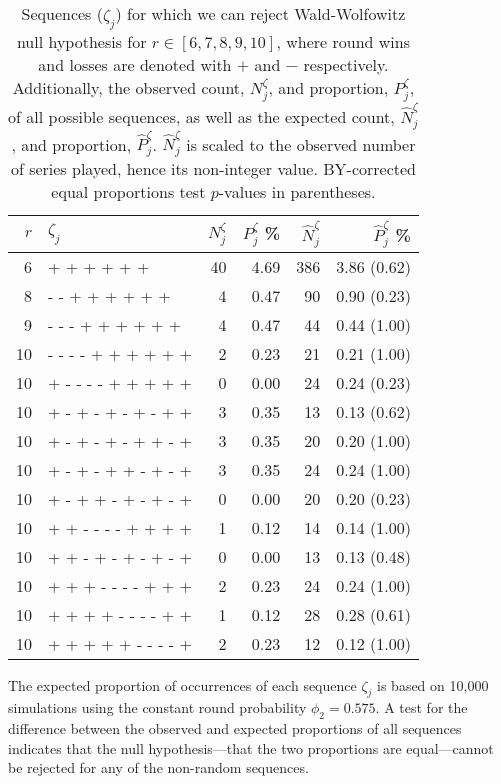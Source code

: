 \documentclass{article}
\begin{document}
\begin{table}

\caption{Sequences ($\zeta_j$) for which we can reject Wald-Wolfowitz null hypothesis for $r \in [6, 7, 8, 9, 10]$, where round wins and losses are denoted with $+$ and $-$ respectively. Additionally, the observed count, $N^{\zeta}_j$, and proportion, $P^{\zeta}_j$, of all possible sequences, as well as the expected count, $\hat{N}^{\zeta}_j$, and proportion, $\hat{P}^{\zeta}_j$. $\hat{N}^{\zeta}_j$ is scaled to the observed number of series played, hence its non-integer value. BY-corrected equal proportions test $p$-values in parentheses.}

\centering
\begin{tabular}{rlrrrr}
\toprule
$r$ & $\zeta_j$ & $N^{\zeta}_j$ & $P^{\zeta}_j$ \% & $\hat{N}^{\zeta}_j$ & $\hat{P}^{\zeta}_j$ \% \\ 
\midrule

6 & + + + + + + & 40 & 4.69 & 386 & 3.86 (0.62) \\ 
8 & - - + + + + + + & 4 & 0.47 & 90 & 0.90 (0.23) \\ 
9 & - - - + + + + + + & 4 & 0.47 & 44 & 0.44 (1.00) \\ 
10 & - - - - + + + + + + & 2 & 0.23 & 21 & 0.21 (1.00) \\ 
10 & + - - - - + + + + + & 0 & 0.00 & 24 & 0.24 (0.23) \\ 
10 & + - + - + - + - + + & 3 & 0.35 & 13 & 0.13 (0.62) \\ 
10 & + - + - + - + + - + & 3 & 0.35 & 20 & 0.20 (1.00) \\ 
10 & + - + - + + - + - + & 3 & 0.35 & 24 & 0.24 (1.00) \\ 
10 & + - + + - + - + - + & 0 & 0.00 & 20 & 0.20 (0.23) \\ 
10 & + + - - - - + + + + & 1 & 0.12 & 14 & 0.14 (1.00) \\ 
10 & + + - + - + - + - + & 0 & 0.00 & 13 & 0.13 (0.48) \\ 
10 & + + + - - - - + + + & 2 & 0.23 & 24 & 0.24 (1.00) \\ 
10 & + + + + - - - - + + & 1 & 0.12 & 28 & 0.28 (0.61) \\ 
10 & + + + + + - - - - + & 2 & 0.23 & 12 & 0.12 (1.00) \\ 

\bottomrule
\end{tabular}

\label{tbl:ww-sequences}
\end{table}

The expected proportion of occurrences of each sequence \(\zeta_j\) is
based on 10,000 simulations using the constant round probability
\(\phi_2 = 0.575\). A test for the difference between the observed and
expected proportions of all sequences indicates that the null
hypothesis---that the two proportions are equal---cannot be rejected for
any of the non-random sequences.
\end{document}
